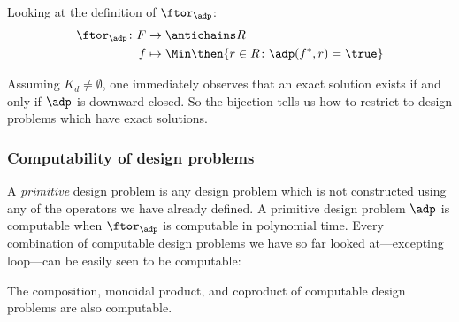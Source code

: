 Looking at the definition of $\ftor_\adp$:
\begin{equation}
	\begin{aligned}
		\ftor_\adp \colon F & \to \antichains R                                            \\
		f                   & \mapsto \Min \then \{ r \in R \colon \adp(f^*, r) = \true \}
	\end{aligned}
\end{equation}

Assuming $K_d \neq \emptyset$, one immediately observes that an exact solution exists if and only if $\adp$ is downward-closed.
So the bijection tells us how to restrict to design problems which have exact solutions.

\subsubsection{Computability of design problems}

A \emph{primitive} design problem is any design problem which is not constructed using any of the operators we have already defined.
A primitive design problem $\adp$ is computable when $\ftor_\adp$ is computable in polynomial time.
Every combination of computable design problems we have so far looked at---excepting loop---can be easily seen to be computable:

\begin{proposition}
	The composition, monoidal product, and coproduct of computable design problems are also computable.
\end{proposition}

